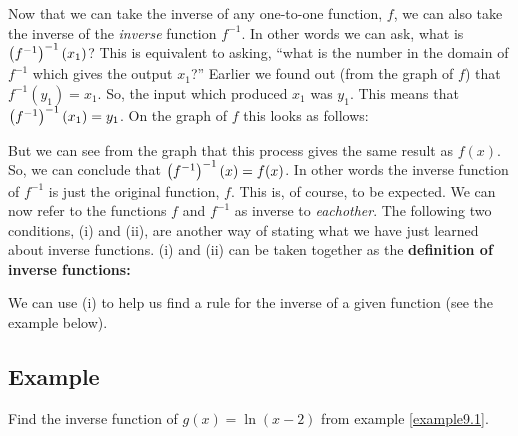 \noindent Now that we can take the inverse of any one-to-one function, $f$, we can also take the inverse of the \textit{inverse} function $f^{-1}$. In other words we can ask, what is $\left(f^{-1}\right)^{-1}\left(x_1\right)$? This is equivalent to asking, ``what is the number in the domain of $f^{-1}$ which gives the output $x_1$?'' Earlier we found out (from the graph of $f$) that $f^{-1}(y_1) = x_1$. So, the input which produced $x_1$ was $y_1$. This means that $\left(f^{-1}\right)^{-1}(x_1) = y_1$. On the graph of $f$ this looks as follows:
\begin{center}
\end{center}
But we can see from the graph that this process gives the same result as $f(x)$. So, we can conclude that $\left(f^{-1}\right)^{-1}(x) = f(x)$. In other words the inverse function of $f^{-1}$ is just the original function, $f$. This is, of course, to be expected. We can now refer to the functions $f$ and $f^{-1}$ as inverse to \textit{eachother}. The following two conditions, (i) and (ii), are another way of stating what we have just learned about inverse functions. (i) and (ii) can be taken together as the \textbf{definition of inverse functions:} \\
\bigskip

\hfil{}
\bigskip

\noindent We can use (i) to help us find a rule for the inverse of a given function (see the example below).

\subsection{Example} \label{ex9.inverse}
Find the inverse function of $g(x) = \ln(x-2)$ from example \ref{example9.1}. \\

